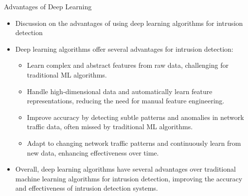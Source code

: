 \documentclass{beamer}
\begin{document}
\begin{frame}{Advantages of Deep Learning}
  \begin{itemize}
    \item Discussion on the advantages of using deep learning algorithms for intrusion detection
  \end{itemize}

  \begin{itemize}
    \item Deep learning algorithms offer several advantages for intrusion detection:
      \begin{itemize}
        \item Learn complex and abstract features from raw data, challenging for traditional ML algorithms.
        \item Handle high-dimensional data and automatically learn feature representations, reducing the need for manual feature engineering.
        \item Improve accuracy by detecting subtle patterns and anomalies in network traffic data, often missed by traditional ML algorithms.
        \item Adapt to changing network traffic patterns and continuously learn from new data, enhancing effectiveness over time.
      \end{itemize}
    \item Overall, deep learning algorithms have several advantages over traditional machine learning algorithms for intrusion detection, improving the accuracy and effectiveness of intrusion detection systems.
  \end{itemize}
\end{frame}
\end{document}
